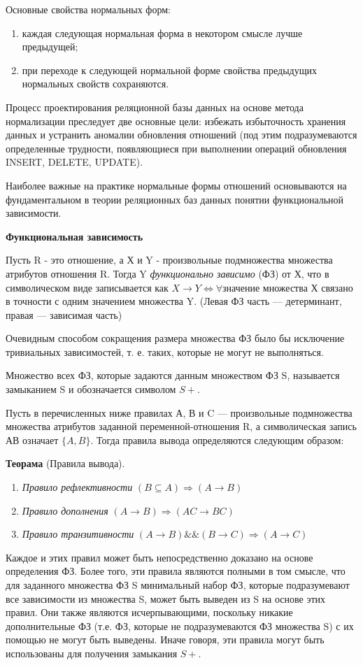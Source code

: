 Основные свойства нормальных форм:
\begin{enumerate}
	\item каждая следующая нормальная форма в некотором смысле лучше предыдущей;
	\item при переходе к следующей нормальной форме свойства предыдущих нормальных свойств сохраняются. 
\end{enumerate}

Процесс проектирования реляционной базы данных на основе метода нормализации преследует две основные цели: избежать избыточность хранения данных и устранить аномалии обновления отношений (под этим подразумеваются определенные трудности, появляющиеся при выполнении операций обновления INSERT, DELETE, UPDATE).

Наиболее важные на практике нормальные формы отношений основываются на фундаментальном в теории
реляционных баз данных понятии функциональной зависимости.

\textbf{Функциональная зависимость}

Пусть R - это отношение, а Х и Y - произвольные подмножества множества атрибутов отношения R. Тогда Y
\textit{функционально зависимо} (ФЗ) от Х, что в символическом виде записывается как $X \to Y \Leftrightarrow \forall$значение множества Х связано в точности с одним значением множества Y. (Левая ФЗ часть --- детерминант, правая --- зависимая часть)

Очевидным способом сокращения размера множества ФЗ было бы исключение тривиальных зависимостей, т. е. таких, которые не могут не выполняться.

Множество всех ФЗ, которые задаются данным множеством ФЗ S, называется замыканием S и обозначается символом $S+$.

Пусть в перечисленных ниже правилах А, В и C — произвольные подмножества множества атрибутов заданной переменной-отношения R, а символическая запись АВ означает $\{A, B\}$. Тогда правила
вывода определяются следующим образом:

\textbf{Теорама} (Правила вывода).
\begin{enumerate}
	\item \textit{Правило рефлективности} $(B \subseteq A) \Rightarrow (A \to B)$
	\item \textit{Правило дополнения} $(A \to B) \Rightarrow (AC \to BC)$
	\item \textit{Правило транзитивности} $(A \to B) \&\& (B \to C) \Rightarrow (A \to C)$
\end{enumerate}
Каждое и этих правил может быть непосредственно доказано на основе определения ФЗ. Более того, эти правила 
являются полными в том смысле, что для заданного множества ФЗ S минимальный набор ФЗ, которые подразумевают 
все зависимости из множества S, может быть выведен из S на основе этих правил. Они также являются 
исчерпывающими, поскольку никакие дополнительные ФЗ (т.е. ФЗ, которые не подразумеваются ФЗ множества S) с их 
помощью не могут быть выведены. Иначе говоря, эти правила могут быть использованы для получения замыкания $S+$.

